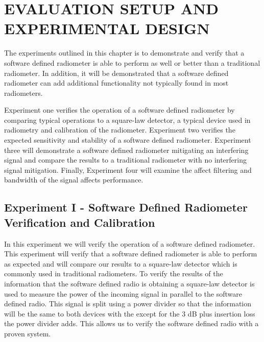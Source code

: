 

\chapter{EVALUATION SETUP AND EXPERIMENTAL DESIGN}\label{ch:exp_design}
The experiments outlined in this chapter is to demonstrate and verify that a software defined radiometer is able to perform as well or better than a traditional radiometer.  In addition, it will be demonstrated that a software defined radiometer can add additional functionality not typically found in most radiometers. 

Experiment one verifies the operation of a software defined radiometer by comparing typical operations to a square-law detector, a typical device used in radiometry and calibration of the radiometer.  Experiment two verifies the expected sensitivity and stability of a software defined radiometer.  Experiment three will demonstrate a software defined radiometer mitigating an interfering signal and compare the results to a traditional radiometer with no interfering signal mitigation.  Finally, Experiment four will examine the affect filtering and bandwidth of the signal affects performance.  

\section{Experiment I - Software Defined Radiometer Verification and Calibration}\label{Exp1}

In this experiment we will verify the operation of a software defined radiometer.  This experiment will verify that a software defined radiometer is able to perform as expected and will compare our results to a square-law detector which is commonly used in traditional radiometers.  
To verify the results of the information that the software defined radio is obtaining a square-law detector is used to measure the power of the incoming signal in parallel to the software defined radio.  This signal is split using a power divider so that the information will be the same to both devices with the except for the 3 dB plus insertion loss the power divider adds.  This allows us to verify the software defined radio with a proven system.  

